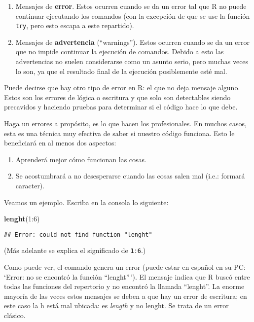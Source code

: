 \documentclass[]{article}
\newenvironment{Shaded}{}{}
\newcommand{\KeywordTok}[1]{\textcolor[rgb]{0.00,0.44,0.13}{\textbf{{#1}}}}
\newcommand{\DecValTok}[1]{\textcolor[rgb]{0.25,0.63,0.44}{{#1}}}
\newcommand{\NormalTok}[1]{{#1}}
\begin{document}
\begin{enumerate}[1.]
\item
  Mensajes de \textbf{error}. Estos ocurren cuando se da un error tal
  que R no puede continuar ejecutando los comandos (con la excepción de
  que se use la función \texttt{try}, pero esto escapa a este
  repartido).
\item
  Mensajes de \textbf{advertencia} (``warnings''). Estos ocurren cuando
  se da un error que no impide continuar la ejecución de comandos.
  Debido a esto las advertencias no suelen considerarse como un asunto
  serio, pero muchas veces lo son, ya que el resultado final de la
  ejecución posiblemente esté mal.
\end{enumerate}
Puede decirse que hay otro tipo de error en R: el que no deja mensaje
alguno. Estos son los errores de lógica o escritura y que solo son
detectables siendo precavidos y haciendo pruebas para determinar si el
código hace lo que debe.

Haga un errores a propósito, es lo que hacen los profesionales. En
muchos casos, esta es una técnica muy efectiva de saber si nuestro
código funciona. Esto le beneficiará en al menos dos aspectos:

\begin{enumerate}[1.]
\item
  Aprenderá mejor cómo funcionan las cosas.
\item
  Se acostumbrará a no desesperarse cuando las cosas salen mal (i.e.:
  formará caracter).
\end{enumerate}
Veamos un ejemplo. Escriba en la consola lo siguiente:

\begin{Shaded}
\begin{Highlighting}[]
\KeywordTok{lenght}\NormalTok{(}\DecValTok{1}\NormalTok{:}\DecValTok{6}\NormalTok{)}
\end{Highlighting}
\end{Shaded}
\begin{verbatim}
## Error: could not find function "lenght"
\end{verbatim}
(Más adelante se explica el significado de \texttt{1:6}.)

Como puede ver, el comando genera un error (puede estar en español en su
PC: `Error: no se encontró la función ``lenght''\,'). El mensaje indica
que R buscó entre todas las funciones del repertorio y no encontró la
llamada ``lenght''. La enorme mayoría de las veces estos mensajes se
deben a que hay un error de escritura; en este caso la h está mal
ubicada: es \emph{length} y no lenght. Se trata de un error clásico.
\end{document}
